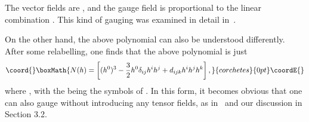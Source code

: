 \documentclass[a4paper,11pt]{article}
\begin{document}
\begin{appendix}
The \coordHE{} vector fields are \coordHE{}, and the \coordHE{} gauge
field is proportional to the linear combination \myHighlight{$[\sqrt{2}
A_{\mu}^{0}+A_{\mu}^{4}]$}\coordHE{}. This kind of gauging was examined in
detail in~\cite{GZ3}.

On the other hand, the above polynomial can also be understood
differently. After some relabelling, one finds that the above
polynomial is just
\begin{displaymath}\coord{}\boxMath{
N(h)=\left[(h^{0})^{3}-\frac{3}{2}h^{0}
\delta_{ij}h^{i}h^{j}+d_{ijk}h^{i}h^{j}h^{k}\right],
}{corchetes}{0pt}\coordE{}\end{displaymath}
where  \coordHE{}, with the \coordHE{} being the
\coordHE{} symbols of \coordHE{}. In this form, it becomes obvious that one
can also gauge \coordHE{} without introducing any tensor fields, as
in~\cite{GST2} and our discussion in Section 3.2.


\end{appendix}
\end{document}
